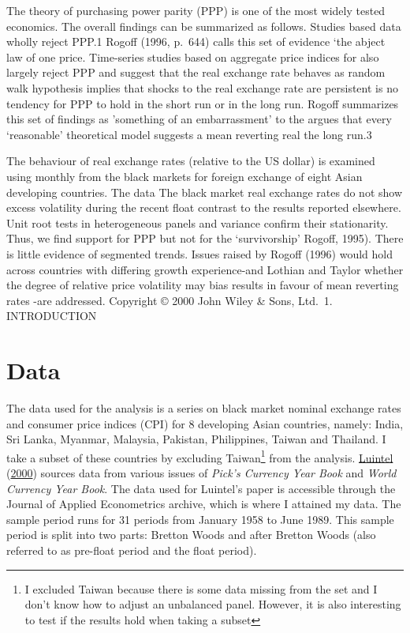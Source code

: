 \documentclass[11pt,preprint, authoryear]{elsarticle}
\numberwithin{equation}{section}
\numberwithin{figure}{section}
\numberwithin{table}{section}
\let\rmarkdownfootnote\footnote%
\def\footnote{\protect\rmarkdownfootnote}
\begin{document}
The theory of purchasing power parity (PPP) is one of the most widely
tested economics. The overall findings can be summarized as follows.
Studies based data wholly reject PPP.1 Rogoff (1996, p.~644) calls this
set of evidence `the abject law of one price. Time-series studies based
on aggregate price indices for also largely reject PPP and suggest that
the real exchange rate behaves as random walk hypothesis implies that
shocks to the real exchange rate are persistent is no tendency for PPP
to hold in the short run or in the long run. Rogoff summarizes this set
of findings as 'something of an embarrassment' to the argues that every
`reasonable' theoretical model suggests a mean reverting real the long
run.3

The behaviour of real exchange rates (relative to the US dollar) is
examined using monthly from the black markets for foreign exchange of
eight Asian developing countries. The data The black market real
exchange rates do not show excess volatility during the recent float
contrast to the results reported elsewhere. Unit root tests in
heterogeneous panels and variance confirm their stationarity. Thus, we
find support for PPP but not for the `survivorship' Rogoff, 1995). There
is little evidence of segmented trends. Issues raised by Rogoff (1996)
would hold across countries with differing growth experience-and Lothian
and Taylor whether the degree of relative price volatility may bias
results in favour of mean reverting rates -are addressed. Copyright ©
2000 John Wiley \& Sons, Ltd.~1. INTRODUCTION

\hypertarget{data}{%
\section{\texorpdfstring{Data \label{Data}}{Data }}\label{data}}

The data used for the analysis is a series on black market nominal
exchange rates and consumer price indices (CPI) for 8 developing Asian
countries, namely: India, Sri Lanka, Myanmar, Malaysia, Pakistan,
Philippines, Taiwan and Thailand. I take a subset of these countries by
excluding Taiwan\footnote{I excluded Taiwan because there is some data
  missing from the set and I don't know how to adjust an unbalanced
  panel. However, it is also interesting to test if the results hold
  when taking a subset} from the analysis.
\protect\hyperlink{ref-Kul}{Luintel} (\protect\hyperlink{ref-Kul}{2000})
sources data from various issues of \emph{Pick's Currency Year Book} and
\emph{World Currency Year Book}. The data used for Luintel's paper is
accessible through the Journal of Applied Econometrics archive, which is
where I attained my data. The sample period runs for 31 periods from
January 1958 to June 1989. This sample period is split into two parts:
Bretton Woods and after Bretton Woods (also referred to as pre-float
period and the float period).
\end{document}
